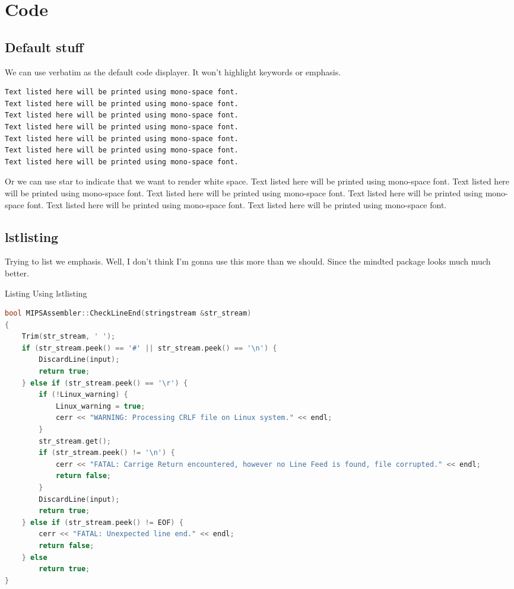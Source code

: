 \documentclass{article}
\begin{document}
\section{Code}
\subsection{Default stuff}
We can use verbatim as the default code displayer. It won't highlight keywords or emphasis.

\begin{verbatim}
Text listed here will be printed using mono-space font.
Text listed here will be printed using mono-space font.
Text listed here will be printed using mono-space font.
Text listed here will be printed using mono-space font.
Text listed here will be printed using mono-space font.
Text listed here will be printed using mono-space font.
Text listed here will be printed using mono-space font.
\end{verbatim}

\begin{verbatim*}
    Or we can use star to indicate that we want to render white space.
    Text listed here will be printed using mono-space font.
    Text listed here will be printed using mono-space font.
    Text listed here will be printed using mono-space font.
    Text listed here will be printed using mono-space font.
    Text listed here will be printed using mono-space font.
    Text listed here will be printed using mono-space font.
\end{verbatim*}

\subsection{lstlisting}
Trying to list we emphasis.
Well, I don't think I'm gonna use this more than we should.
Since the mindted package looks much much better.
\begin{listing}[H]
    \caption{Listing Using lstlisting}
    \begin{lstlisting}[language=c++]
bool MIPSAssembler::CheckLineEnd(stringstream &str_stream)
{
    Trim(str_stream, ' ');
    if (str_stream.peek() == '#' || str_stream.peek() == '\n') {
        DiscardLine(input);
        return true;
    } else if (str_stream.peek() == '\r') {
        if (!Linux_warning) {
            Linux_warning = true;
            cerr << "WARNING: Processing CRLF file on Linux system." << endl;
        }
        str_stream.get();
        if (str_stream.peek() != '\n') {
            cerr << "FATAL: Carrige Return encountered, however no Line Feed is found, file corrupted." << endl;
            return false;
        }
        DiscardLine(input);
        return true;
    } else if (str_stream.peek() != EOF) {
        cerr << "FATAL: Unexpected line end." << endl;
        return false;
    } else
        return true;
}
    \end{lstlisting}
\end{listing}
\end{document}
